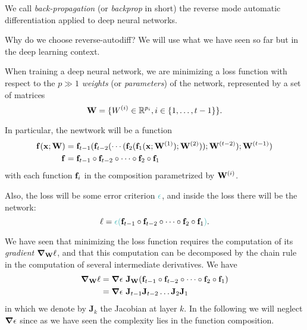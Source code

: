 
We call \emph{back-propagation} (or \emph{backprop} in short) the reverse mode automatic differentiation applied to deep neural networks. 

Why do we choose reverse-autodiff? We will use what we have seen so far but in the deep learning context.

When training a deep neural network, we are minimizing a loss function with respect to the $p \gg 1$ \emph{weights} (or \emph{parameters}) of the network, represented by a set of matrices 
\begin{equation}
    \vb{W} = \{W^{(i)} \in \mathbb{R}^{p_i}, i \in \{1, \dots, t-1\}\}.
\end{equation}

In particular, the newtwork will be a function
\begin{equation}
    \begin{aligned}
        \vb{f}(\vb{x}; \vb{W}) & = \vb{f}_{t-1} ( \vb{f}_{t-2} ( \cdots ( \vb{f}_2 ( \vb{f}_1(\vb{x}; \vb{W}^{(1)}); \vb{W}^{(2)})); \vb{W}^{(t-2)}); \vb{W}^{(t-1)}) \\
        \vb{f} & = \vb{f}_{t-1} \circ \vb{f}_{t-2} \circ \cdots \circ \vb{f}_2 \circ \vb{f}_1
    \end{aligned}
\end{equation}
with each function $\vb{f}_i$ in the composition parametrized by $\vb{W}^{(i)}$.

Also, the loss will be some error criterion $\color{cyan}\epsilon$, and inside the loss there will be the network:
\begin{equation}
    \ell = {\color{cyan}\epsilon(} \vb{f}_{t-1}\circ \vb{f}_{t-2} \circ \cdots \circ \vb{f}_2 \circ \vb{f}_1 {\color{cyan})}.
\end{equation}

We have seen that minimizing the loss function requires the computation of its \emph{gradient} $\grad_{\vb{W}} \ell$, and that this computation can be decomposed by the chain rule in the computation of several intermediate derivatives. We have
\begin{equation}
    \begin{aligned}
        \grad_{\vb{W}} \ell & = \grad \epsilon ~ \vb{J}_{\vb{W}} (\vb{f}_{t-1}\circ \vb{f}_{t-2} \circ \cdots \circ \vb{f}_2 \circ \vb{f}_1) \\
        & = \grad \epsilon ~ \vb{J}_{t-1} \vb{J}_{t-2} \dots \vb{J}_2 \vb{J}_1
    \end{aligned}
    \label{eq:07:3:5:grad}
\end{equation}
in which we denote by $\mathbf{J}_k$ the Jacobian at layer $k$. In the following we will neglect $\grad \epsilon$ since as we have seen the complexity lies in the function composition.

